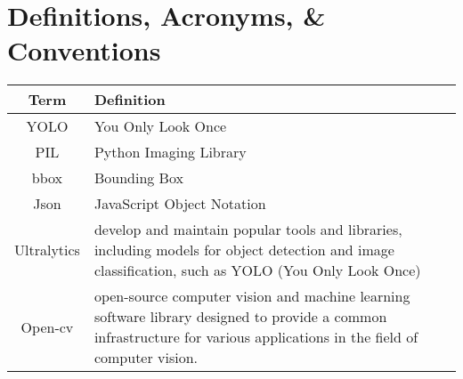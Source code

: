 \section{Definitions, Acronyms, \& Conventions}
\begin{table}[h]
    \centering
    \begin{tabular}{|c|p{12cm}|}
        \hline
        \textbf{Term} & \textbf{Definition}\\
        \hline
        YOLO & You Only Look Once\\
        \hline 
        PIL & Python Imaging Library\\
        \hline  
        bbox & Bounding Box\\
        \hline  
        Json & JavaScript Object Notation\\
        \hline  
        Ultralytics & develop and maintain popular tools and libraries, including models for object detection and image classification, such as YOLO (You Only Look Once)\\
        \hline  
        Open-cv &  open-source computer vision and machine learning software library designed to provide a common infrastructure for various applications in the field of computer vision.\\
        \hline  
        
        
    \end{tabular}
\end{table}